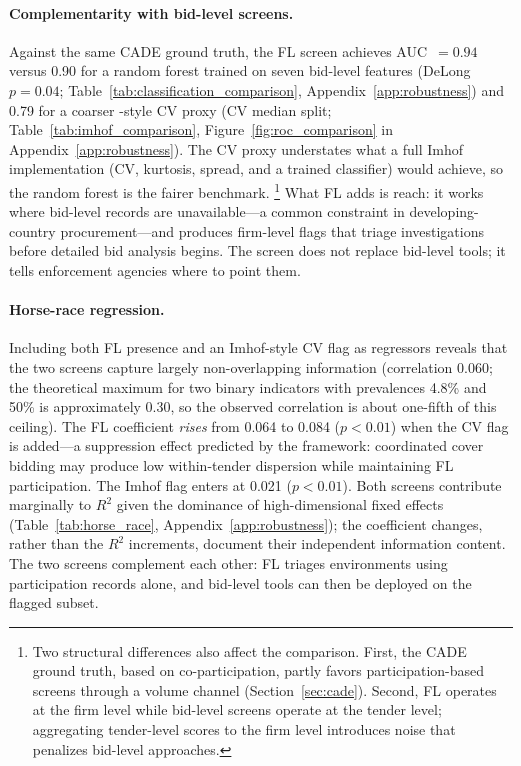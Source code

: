 \paragraph{Complementarity with bid-level screens.}
Against the same CADE ground truth, the FL screen achieves
AUC~$= 0.94$ versus 0.90 for a random forest trained on seven
bid-level features (DeLong $p = 0.04$;
Table~\ref{tab:classification_comparison},
Appendix~\ref{app:robustness}) and 0.79 for a coarser
\citet{imhof2019detecting}-style CV proxy (CV median split;
Table~\ref{tab:imhof_comparison},
Figure~\ref{fig:roc_comparison} in Appendix~\ref{app:robustness}).
The CV proxy understates what a full Imhof implementation (CV,
kurtosis, spread, and a trained classifier) would achieve, so the
random forest is the fairer benchmark.%
\footnote{Two structural differences also affect the comparison.
First, the CADE ground truth, based on co-participation, partly
favors participation-based screens through a volume channel
(Section~\ref{sec:cade}). Second, FL operates at the firm level
while bid-level screens operate at the tender level; aggregating
tender-level scores to the firm level introduces noise that
penalizes bid-level approaches.}
What FL adds is reach: it works where bid-level records are
unavailable---a common constraint in developing-country
procurement---and produces firm-level flags that triage
investigations before detailed bid analysis begins. The screen does
not replace bid-level tools; it tells enforcement agencies where to
point them.

\paragraph{Horse-race regression.}
Including both FL presence and an Imhof-style CV flag as regressors
reveals that the two screens capture largely non-overlapping
information (correlation 0.060; the theoretical maximum for two
binary indicators with prevalences 4.8\% and 50\% is approximately
0.30, so the observed correlation is about one-fifth of this
ceiling). The FL coefficient \emph{rises} from 0.064 to
0.084 ($p < 0.01$) when the CV flag is added---a suppression effect
predicted by the framework: coordinated cover bidding
may produce low within-tender dispersion while maintaining FL
participation. The Imhof flag enters at 0.021 ($p < 0.01$). Both screens
contribute marginally to $R^2$ given the dominance of
high-dimensional fixed effects (Table~\ref{tab:horse_race},
Appendix~\ref{app:robustness}); the coefficient changes, rather
than the $R^2$ increments, document their independent information
content. The two screens complement each other: FL triages
environments using participation records alone, and bid-level tools
can then be deployed on the flagged subset.

